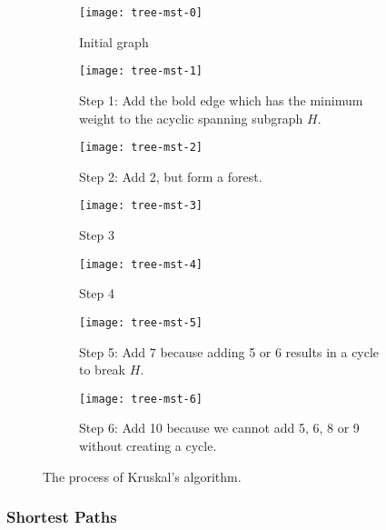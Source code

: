 \documentclass[../src/handouts/main.tex]{subfiles}
\begin{document}
\begin{figure}[htbp]
  \centering
  \begin{subfigure}[t]{.25\textwidth}
    \centering
    \texttt{[image: tree-mst-0]}
    \caption{Initial graph}
    \label{fig:tree-mst-0}
  \end{subfigure}

  \begin{subfigure}[t]{.25\textwidth}
    \centering
    \texttt{[image: tree-mst-1]}
    \caption{Step 1: Add the bold edge which has the minimum weight to the acyclic spanning subgraph $H$.}
    \label{fig:tree-mst-1}
  \end{subfigure}
  \hspace{.1\textwidth}
  \begin{subfigure}[t]{.25\textwidth}
    \centering
    \texttt{[image: tree-mst-2]}
    \caption{Step 2: Add 2, but form a forest.}
    \label{fig:tree-mst-2}
  \end{subfigure}
  \hspace{.1\textwidth}
  \begin{subfigure}[t]{.25\textwidth}
    \centering
    \texttt{[image: tree-mst-3]}
    \caption{Step 3}
    \label{fig:tree-mst-3}
  \end{subfigure}

  \begin{subfigure}[t]{.25\textwidth}
    \centering
    \texttt{[image: tree-mst-4]}
    \caption{Step 4}
    \label{fig:tree-mst-4}
  \end{subfigure}
  \hspace{.1\textwidth}
  \begin{subfigure}[t]{.25\textwidth}
    \centering
    \texttt{[image: tree-mst-5]}
    \caption{Step 5: Add 7 because adding 5 or 6 results in a cycle to break $H$.}
    \label{fig:tree-mst-5}
  \end{subfigure}
  \hspace{.1\textwidth}
  \begin{subfigure}[t]{.25\textwidth}
    \centering
    \texttt{[image: tree-mst-6]}
    \caption{Step 6: Add 10 because we cannot add 5, 6, 8 or 9 without creating a cycle.}
    \label{fig:tree-mst-6}
  \end{subfigure}
  \caption{The process of Kruskal's algorithm.}
  \label{fig:tree-mst}
\end{figure}

\subsubsection{Shortest Paths}
\end{document}
